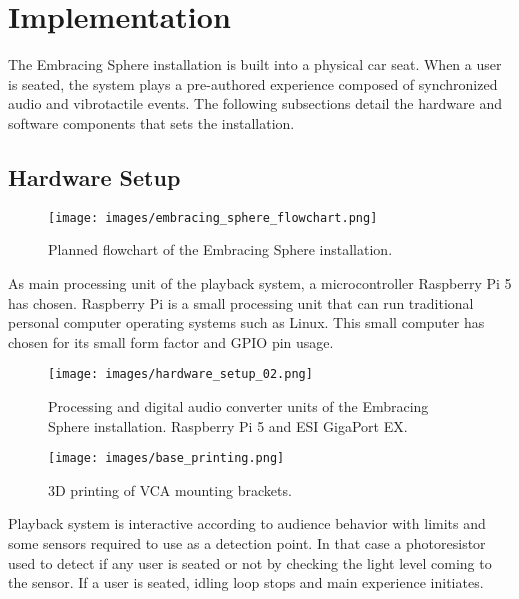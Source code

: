\chapter{Implementation}
    The Embracing Sphere installation is built into a physical car seat. When a user is seated, the system plays a pre-authored experience composed of synchronized audio and vibrotactile events. The following subsections detail the hardware and software components that sets the installation.\par
    \section{Hardware Setup}
        \begin{figure}[H]
            \centering
            \texttt{[image: images/embracing\_sphere\_flowchart.png]}
            \caption{Planned flowchart of the Embracing Sphere installation.}
            \label{fig:ES_FLOW}
        \end{figure}

        As main processing unit of the playback system, a microcontroller Raspberry Pi 5 has chosen. Raspberry Pi is a small processing unit that can run traditional personal computer operating systems such as Linux. This small computer has chosen for its small form factor and GPIO pin usage.\par

        \begin{figure}[H]
            \centering
            \texttt{[image: images/hardware\_setup\_02.png]}
            \caption{Processing and digital audio converter units of the Embracing Sphere installation. Raspberry Pi 5 and ESI GigaPort EX.}
            \label{fig:HARD_SETUP_01}
        \end{figure}

        \begin{figure}[H]
            \centering
            \texttt{[image: images/base\_printing.png]}
            \caption{3D printing of VCA mounting brackets.}
            \label{fig:HARD_SETUP_06}
        \end{figure}

        Playback system is interactive according to audience behavior with limits and some sensors required to use as a detection point. In that case a photoresistor used to detect if any user is seated or not by checking the light level coming to the sensor. If a user is seated, idling loop stops and main experience initiates.\par      

